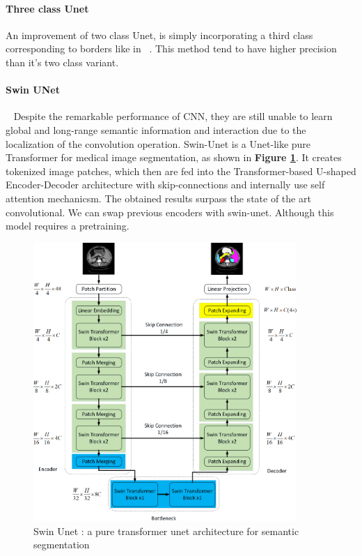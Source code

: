 \documentclass[main.tex]{subfiles}
\begin{document}
\paragraph{Three class Unet} An improvement of two class Unet, is simply incorporating a third class corresponding to borders like in ~\cite{Caicedo2019}. This method tend to have higher precision than it's two class variant.

\paragraph{Swin UNet}~\cite{Cao2021} Despite the remarkable performance of CNN, they are still unable to learn global and long-range semantic information and interaction due to the localization of the convolution operation. Swin-Unet is a Unet-like pure Transformer for medical image segmentation, as shown in \textbf{Figure \ref{fig:swin}}. It creates tokenized image patches, which then are fed into the Transformer-based U-shaped Encoder-Decoder architecture with skip-connections and internally use self attention mechanicsm. The obtained results surpass the state of the art convolutional. We can swap previous encoders with swin-unet. Although this model requires a pretraining.

\begin{figure}
    \centering
    \includegraphics[width=10cm]{images/swin.png}
    \caption{Swin Unet : a pure transformer unet architecture for semantic segmentation}
    \label{fig:swin}
\end{figure}
\end{document}
